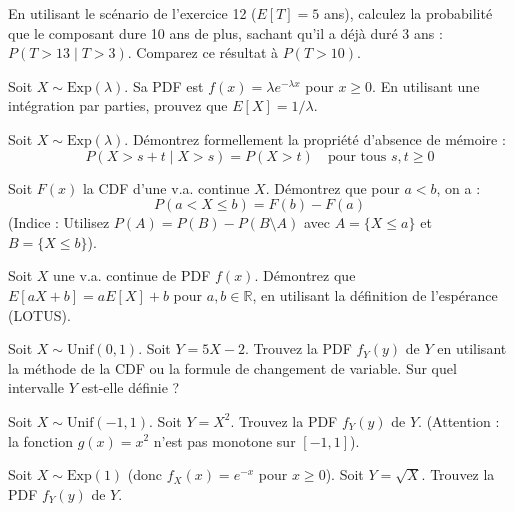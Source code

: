 \begin{exercicebox}[Exercice 13 :]
En utilisant le scénario de l'exercice 12 ($E[T]=5$ ans), calculez la probabilité que le composant dure 10 ans de plus, sachant qu'il a déjà duré 3 ans : $P(T > 13 \mid T > 3)$. Comparez ce résultat à $P(T > 10)$.
\end{exercicebox}

\begin{exercicebox}[Exercice 14 :]
Soit $X \sim \text{Exp}(\lambda)$. Sa PDF est $f(x) = \lambda e^{-\lambda x}$ pour $x \ge 0$.
En utilisant une intégration par parties, prouvez que $E[X] = 1/\lambda$.
\end{exercicebox}

\begin{exercicebox}[Exercice 15 :]
Soit $X \sim \text{Exp}(\lambda)$. Démontrez formellement la propriété d'absence de mémoire :
$$ P(X > s+t \mid X > s) = P(X > t) \quad \text{pour tous } s, t \ge 0 $$
\end{exercicebox}

\begin{exercicebox}[Exercice 16 :]
Soit $F(x)$ la CDF d'une v.a. continue $X$. Démontrez que pour $a < b$, on a :
$$ P(a < X \le b) = F(b) - F(a) $$
(Indice : Utilisez $P(A) = P(B) - P(B \setminus A)$ avec $A = \{X \le a\}$ et $B = \{X \le b\}$).
\end{exercicebox}

\begin{exercicebox}[Exercice 17 :]
Soit $X$ une v.a. continue de PDF $f(x)$. Démontrez que $E[aX + b] = aE[X] + b$ pour $a, b \in \mathbb{R}$, en utilisant la définition de l'espérance (LOTUS).
\end{exercicebox}

\begin{exercicebox}[Exercice 18 :]
Soit $X \sim \text{Unif}(0, 1)$. Soit $Y = 5X - 2$.
Trouvez la PDF $f_Y(y)$ de $Y$ en utilisant la méthode de la CDF ou la formule de changement de variable. Sur quel intervalle $Y$ est-elle définie ?
\end{exercicebox}

\begin{exercicebox}[Exercice 19 :]
Soit $X \sim \text{Unif}(-1, 1)$. Soit $Y = X^2$.
Trouvez la PDF $f_Y(y)$ de $Y$. (Attention : la fonction $g(x)=x^2$ n'est pas monotone sur $[-1, 1]$).
\end{exercicebox}

\begin{exercicebox}[Exercice 20 :]
Soit $X \sim \text{Exp}(1)$ (donc $f_X(x) = e^{-x}$ pour $x \ge 0$). Soit $Y = \sqrt{X}$.
Trouvez la PDF $f_Y(y)$ de $Y$.
\end{exercicebox}